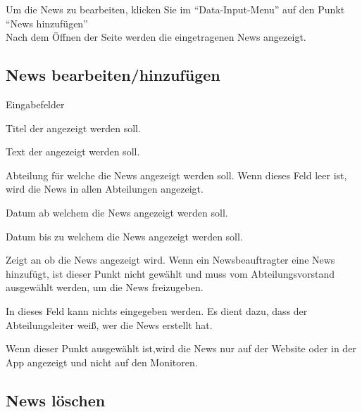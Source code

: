 Um die News zu bearbeiten, klicken Sie im \enquote{Data-Input-Menu} auf den Punkt \enquote{News hinzufügen}
\\
Nach dem Öffnen der Seite werden die eingetragenen News angezeigt.
\\

\subsection{News bearbeiten/hinzufügen}
\begin{description}
Eingabefelder
\item[Titel] Titel der angezeigt werden soll.
\item[Text] Text der angezeigt werden soll.
\item[Abt.] Abteilung für welche die News angezeigt werden soll. Wenn dieses Feld leer ist, wird die News in allen Abteilungen angezeigt.
\item[Anzeigebeginn-Datum] Datum ab welchem die News angezeigt werden soll.
\item[Anzeigeend-Datum] Datum bis zu welchem die News angezeigt werden soll.
\item[Anzeigen] Zeigt an ob die News angezeigt wird. Wenn ein Newsbeauftragter eine News hinzufügt, ist dieser Punkt nicht gewählt und muss vom Abteilungsvorstand ausgewählt werden, um die News freizugeben. 
\item[Ersteller] In dieses Feld kann nichts eingegeben werden. Es dient dazu, dass der Abteilungsleiter weiß, wer die News erstellt hat.
\item[Nur Website] Wenn dieser Punkt ausgewählt ist,wird die News nur auf der Website oder in der App angezeigt und nicht auf den Monitoren.
\end{description}

\subsection{News löschen}